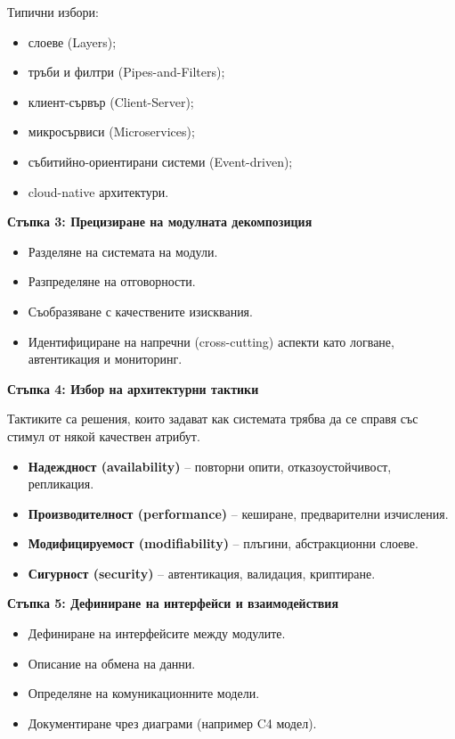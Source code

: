 \documentclass{article}
\renewcommand{\\}{\newline}
\begin{document}
Типични избори:
\begin{itemize}
    \item слоеве (Layers);
    \item тръби и филтри (Pipes-and-Filters);
    \item клиент-сървър (Client-Server);
    \item микросървиси (Microservices);
    \item събитийно-ориентирани системи (Event-driven);
    \item cloud-native архитектури.
\end{itemize}

\textbf{Стъпка 3: Прецизиране на модулната декомпозиция}

\begin{itemize}
    \item Разделяне на системата на модули.
    \item Разпределяне на отговорности.
    \item Съобразяване с качествените изисквания.
    \item Идентифициране на напречни (cross-cutting) аспекти като логване, автентикация и мониторинг.
\end{itemize}

\textbf{Стъпка 4: Избор на архитектурни тактики}

Тактиките са решения, които задават как системата трябва да се справя със стимул от някой качествен атрибут.

\begin{itemize}
    \item \textbf{Надеждност (availability)} – повторни опити, отказоустойчивост, репликация.
    \item \textbf{Производителност (performance)} – кеширане, предварителни изчисления.
    \item \textbf{Модифицируемост (modifiability)} – плъгини, абстракционни слоеве.
    \item \textbf{Сигурност (security)} – автентикация, валидация, криптиране.
\end{itemize}

\textbf{Стъпка 5: Дефиниране на интерфейси и взаимодействия}

\begin{itemize}
    \item Дефиниране на интерфейсите между модулите.
    \item Описание на обмена на данни.
    \item Определяне на комуникационните модели.
    \item Документиране чрез диаграми (например C4 модел).
\end{itemize}
\end{document}
